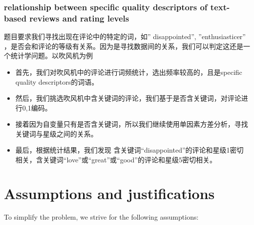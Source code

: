 \documentclass{mcmthesis}
\begin{document}
\subsubsection{relationship between specific quality descriptors of text-based reviews and rating levels}
题目要求我们寻找出现在评论中的特定的词，如” disappointed”, ”enthusiasticer” ，是否会和评论的等级有关系。因为是寻找数据间的关系，我们可以判定这还是一个统计学问题。以吹风机为例
\begin{itemize}
	\item 首先，我们对吹风机中的评论进行词频统计，选出频率较高的，且是specific quality descriptors的词语。
	\item 然后，我们挑选吹风机中含关键词的评论，我们基于是否含关键词，对评论进行0,1编码。
	\item 接着因为自变量只有是否含关键词，所以我们继续使用单因素方差分析，寻找关键词与星级之间的关系。
	\item 最后，根据统计结果，我们发现
	含关键词“disappointed”的评论和星级1密切相关，含关键词“love”或“great”或“good”的评论和星级5密切相关。
\end{itemize}
\section{Assumptions and justifications}

To simplify the problem, we strive for the following assumptions:
\end{document}
